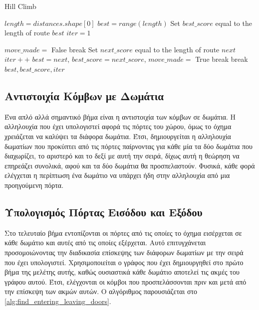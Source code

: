 \begin{algorithm}[H]
\caption{Hill Climb}
\label{alg:hc}
\begin{algorithmic}[1]
        \State $length = distances.shape[0]$
        \State $best = range(length)$
        \State Set $best\_score$ equal to the length of route $best$
        \State $iter = 1$
        
            \State $move\_made = $ False
                    \State break
                \EndIf
                \State Set $next\_score$ equal to the length of route $next$
                \State $iter++$
                    \State $best = next$, $best\_score = next\_score$, $move\_made = $ True
                    \State break
                \EndIf
            \EndFor
                \State break
            \EndIf
        \EndWhile
        \State \Return $best, best\_score, iter$
\end{algorithmic}
\end{algorithm}




\subsection{Aντιστοιχία Κόμβων με Δωμάτια}
\label{subsection:doors_rooms_correspondense}

Ένα απλό αλλά σημαντικό βήμα είναι η αντιστοιχία των κόμβων σε δωμάτια. Η αλληλουχία που έχει υπολογιστεί αφορά τις πόρτες του χώρου, όμως το όχημα χρειάζεται να καλύψει τα διάφορα δωμάτια. Έτσι, δημιουργείται η αλληλουχία δωματίων που προκύπτει από τις πόρτες παίρνοντας για κάθε μία τα δύο δωμάτια που διαχωρίζει, το αριστερό και το δεξί με αυτή την σειρά, δίχως αυτή η θεώρηση να επηρεάζει συνολικά, αφού και τα δύο δωμάτια θα προσπελαστούν. Φυσικά, κάθε φορά ελέγχεται η περίπτωση ένα δωμάτιο να υπάρχει ήδη στην αλληλουχία από μια προηγούμενη πόρτα.


\subsection{Υπολογισμός Πόρτας Εισόδου και Εξόδου}
\label{subsection:enterin_leaving_door_implementation}

Στο τελευταίο βήμα εντοπίζονται οι πόρτες από τις οποίες το όχημα εισέρχεται σε κάθε δωμάτιο και αυτές από τις οποίες εξέρχεται. Αυτό επιτυγχάνεται προσομοιώνοντας την διαδικασία επίσκεψης των διάφορων δωματίων με την σειρά που έχει υπολογιστεί. Χρησιμοποιείται ο γράφος που έχει δημιουργηθεί στο πρώτο βήμα της μελέτης αυτής, καθώς ουσιαστικά κάθε δωμάτιο αποτελεί τις ακμές του γράφου αυτού. Έτσι, ελέγχονται οι κόμβοι που προσπελάσσονται πριν και μετά από την επίσκεψη των ακμών αυτών. Ο αλγόριθμος παρουσιάζεται στο \ref{alg:find_entering_leaving_doors}.

